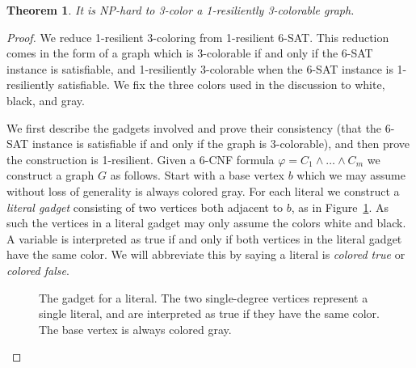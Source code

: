 \documentclass[10pt]{article}
\newtheorem{thm}{Theorem}
\begin{document}
\begin{thm}\label{thm:3-1}
It is NP-hard to 3-color a 1-resiliently 3-colorable graph.
\end{thm}
\begin{proof}
We reduce 1-resilient 3-coloring from 1-resilient 6-SAT. This reduction comes
in the form of a graph which is 3-colorable if and only if the 6-SAT instance is
satisfiable, and 1-resiliently 3-colorable when the 6-SAT instance is
1-resiliently satisfiable. We fix the three colors used in the discussion to
white, black, and gray.

We first describe the gadgets involved and prove their consistency (that the
6-SAT instance is satisfiable if and only if the graph is 3-colorable), and
then prove the construction is 1-resilient. Given a 6-CNF formula $\varphi = C_1
\wedge \dots \wedge C_m$ we construct a graph $G$ as follows. Start with a base
vertex $b$ which we may assume without loss of generality is always colored
gray. For each literal we construct a \emph{literal gadget} consisting of two
vertices both adjacent to $b$, as in Figure~\ref{fig:literal-gadget}. As such
the vertices in a literal gadget may only assume the colors white and black. A
variable is interpreted as true if and only if both vertices in the literal
gadget have the same color. We will abbreviate this by saying a literal is
\emph{colored true} or \emph{colored false}.

\begin{figure}[bht]
\centering
{}
\caption{The gadget for a literal. The two single-degree vertices represent a
single literal, and are interpreted as true if they have the same color. The
base vertex is always colored gray.}
\label{fig:literal-gadget}
\end{figure}


\end{proof}
\end{document}
